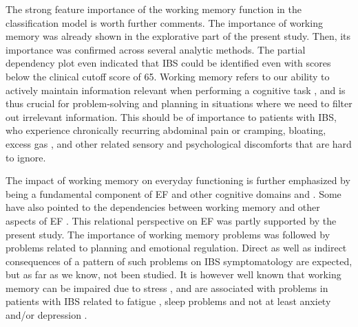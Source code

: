 \documentclass[jcm,article,submit,pdftex,moreauthors]{Definitions/mdpi}
\begin{document}
The strong feature importance of the working memory function in the classification model is worth further comments. The importance of working memory was already shown in the explorative part of the present study. Then, its importance was confirmed across several analytic methods. The partial dependency plot even indicated that IBS could be identified even with scores below the clinical cutoff score of 65.  
Working memory refers to our ability to actively maintain information relevant when performing a cognitive task \cite{baddeley2012working, d2015cognitive}, and is thus crucial for problem-solving and planning in situations where we need to filter out irrelevant information. This should be of importance to patients with IBS, who experience chronically recurring abdominal pain or cramping, bloating, excess gas \cite{drossman2022rome}, and other related sensory and psychological discomforts that are hard to ignore. 

 The impact of working memory on everyday functioning is further emphasized by being a fundamental component of EF and other cognitive domains and  \cite{baddeley2012working}. Some have also pointed to the dependencies between working memory and other aspects of EF \cite{cowan2008differences}. This relational perspective on EF was partly supported by the present study. The importance of working memory problems was followed by problems related to planning and emotional regulation. Direct as well as indirect consequences of a pattern of such problems on IBS symptomatology are expected, but as far as we know, not been studied. It is however well known that working memory can be impaired due to stress \cite{oei2006psychosocial}, and are associated with problems in patients with IBS related to fatigue \cite{han2016fatigue}, sleep problems \cite{wang2018prevalence} and not at least anxiety and/or depression \cite{moran2016anxiety}.  
 
\end{document}
